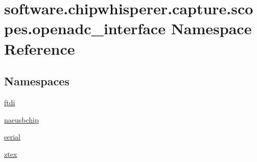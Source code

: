 \hypertarget{namespacesoftware_1_1chipwhisperer_1_1capture_1_1scopes_1_1openadc__interface}{}\section{software.\+chipwhisperer.\+capture.\+scopes.\+openadc\+\_\+interface Namespace Reference}
\label{namespacesoftware_1_1chipwhisperer_1_1capture_1_1scopes_1_1openadc__interface}
\subsection*{Namespaces}
\begin{DoxyCompactItemize}
\item 
 \hyperlink{namespacesoftware_1_1chipwhisperer_1_1capture_1_1scopes_1_1openadc__interface_1_1ftdi}{ftdi}
\item 
 \hyperlink{namespacesoftware_1_1chipwhisperer_1_1capture_1_1scopes_1_1openadc__interface_1_1naeusbchip}{naeusbchip}
\item 
 \hyperlink{namespacesoftware_1_1chipwhisperer_1_1capture_1_1scopes_1_1openadc__interface_1_1serial}{serial}
\item 
 \hyperlink{namespacesoftware_1_1chipwhisperer_1_1capture_1_1scopes_1_1openadc__interface_1_1ztex}{ztex}
\end{DoxyCompactItemize}
